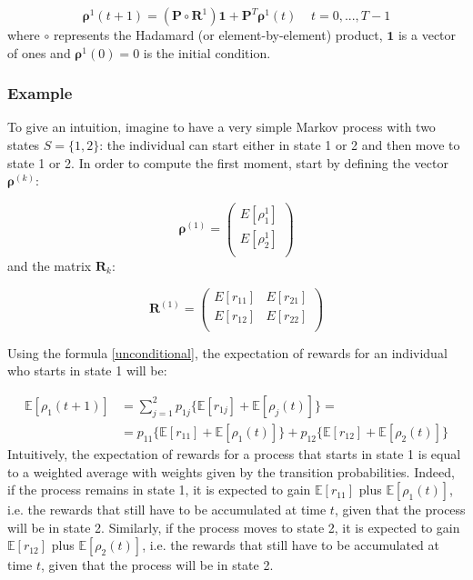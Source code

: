 \documentclass[\main/main.tex]{subfiles}
\begin{document}
\begin{equation}
        \bm{\rho}^1(t+1) = (\mathbf{P} \circ \mathbf{R}^1) \mathbf{1} + \mathbf{P}^T \bm{\rho}^1(t) \;\;\;\; t=0,..., T-1
\end{equation}
where $\circ$ represents the Hadamard (or element-by-element) product, $\mathbf{1}$ is a vector of ones and $\bm{\rho}^1(0) = 0$ is the initial condition.




\subsubsection{Example}
To give an intuition, imagine to have a very simple Markov process with two states $S=\{1,2\}$: the individual can start either in state 1 or 2 and then move to state 1 or 2. In order to compute the first moment, start by defining the vector$ \bm{\rho}^{(k)}$:

\begin{equation}
 \bm{\rho}^{(1)} =
\begin{pmatrix}
E[\rho^1_1]\\
E[\rho^1_2]\\
\end{pmatrix}
\end{equation}
and the matrix $\mathbf{R}_k$:

\begin{equation}
 \bm{R}^{(1)} =
\begin{pmatrix}
E[r_{11}] & E[r_{21}]\\
E[r_{12}] & E[r_{22}]\\
\end{pmatrix}
\end{equation}

\noindent Using the formula \ref{unconditional}, the expectation of rewards for an individual who starts in state 1 will be:

\begin{equation}
\begin{split}
  \mathds{E}[\rho_1(t+1)] &= \sum_{j=1}^2 p_{1j}\{ \mathds{E}[r_{1j}] + \mathds{E}[\rho_j(t)] \}=  \\
  &= p_{11}\{ \mathds{E}[r_{11}] + \mathds{E}[\rho_1(t)] \} + p_{12}\{ \mathds{E}[r_{12}] + \mathds{E}[\rho_2(t)] \}
\end{split}
\end{equation}
Intuitively, the expectation of rewards for a process that starts in state 1 is equal to a weighted average with weights given by the transition probabilities. Indeed, if the process remains in state 1, it is expected to gain $\mathds{E}[r_{11}]$ plus $\mathds{E}[\rho_1(t)] $, i.e. the rewards that still have to be accumulated at time $t$, given that the process will be in state 2. Similarly, if the process moves to state 2, it is expected to gain $\mathds{E}[r_{12}]$ plus $\mathds{E}[\rho_2(t)] $, i.e. the rewards that still have to be accumulated at time $t$, given that the process will be in state 2.
\end{document}
